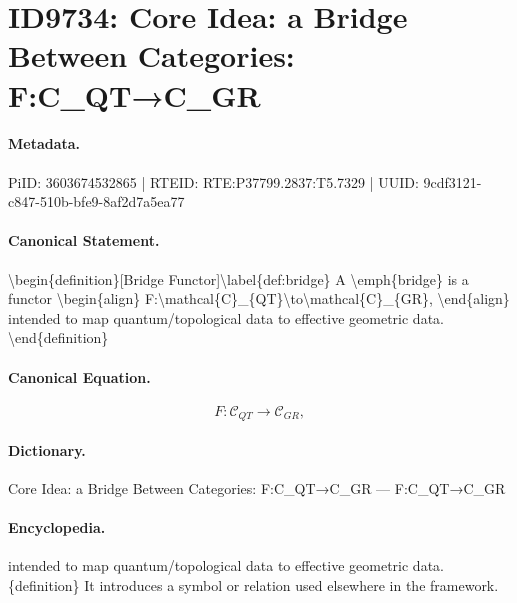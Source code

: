 \section*{ID9734: Core Idea: a Bridge Between Categories: F:C\_QT→C\_GR}
\paragraph{Metadata.}
PiID: 3603674532865 | RTEID: RTE:P37799.2837:T5.7329 | UUID: 9cdf3121-c847-510b-bfe9-8af2d7a5ea77

\paragraph{Canonical Statement.}
\textbackslash{}begin\{definition\}[Bridge Functor]\textbackslash{}label\{def:bridge\} A \textbackslash{}emph\{bridge\} is a functor \textbackslash{}begin\{align\} F:\textbackslash{}mathcal\{C\}\_\{QT\}\textbackslash{}to\textbackslash{}mathcal\{C\}\_\{GR\}, \textbackslash{}end\{align\} intended to map quantum/topological data to effective geometric data. \textbackslash{}end\{definition\}

\paragraph{Canonical Equation.}
\[
F:\mathcal{C}_{QT}\to\mathcal{C}_{GR},
\]

\paragraph{Dictionary.}
Core Idea: a Bridge Between Categories: F:C\_QT→C\_GR — F:C\_QT→C\_GR

\paragraph{Encyclopedia.}
intended to map quantum/topological data to effective geometric data. \{definition\} It introduces a symbol or relation used elsewhere in the framework.

